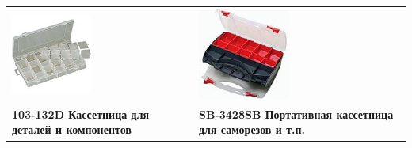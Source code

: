 
\begin{tabular}{p{} p{}}
\noindent\includegraphics[width=0.45\textwidth]{tech/tools/proskit/103-132D.jpg}
&
\noindent\includegraphics[width=0.45\textwidth]{tech/tools/proskit/SB-3428SB.jpg}
\\
\textbf{103-132D Кассетница для деталей и компонентов}
&
\textbf{SB-3428SB Портативная кассетница для саморезов и т.п.}
\\
\end{tabular}
\clearpage



